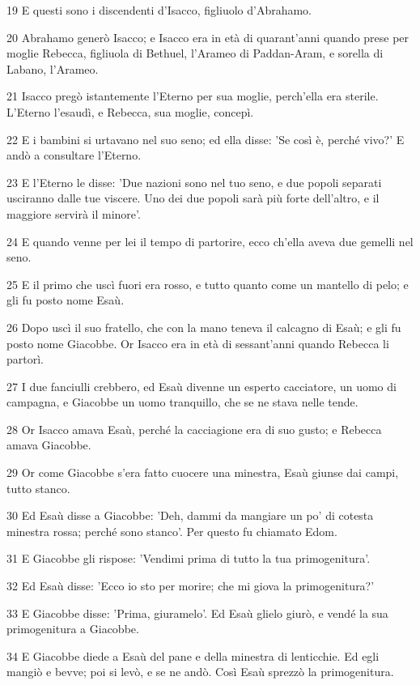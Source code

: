 \par 19 E questi sono i discendenti d'Isacco, figliuolo d'Abrahamo.
\par 20 Abrahamo generò Isacco; e Isacco era in età di quarant'anni quando prese per moglie Rebecca, figliuola di Bethuel, l'Arameo di Paddan-Aram, e sorella di Labano, l'Arameo.
\par 21 Isacco pregò istantemente l'Eterno per sua moglie, perch'ella era sterile. L'Eterno l'esaudì, e Rebecca, sua moglie, concepì.
\par 22 E i bambini si urtavano nel suo seno; ed ella disse: 'Se così è, perché vivo?' E andò a consultare l'Eterno.
\par 23 E l'Eterno le disse: 'Due nazioni sono nel tuo seno, e due popoli separati usciranno dalle tue viscere. Uno dei due popoli sarà più forte dell'altro, e il maggiore servirà il minore'.
\par 24 E quando venne per lei il tempo di partorire, ecco ch'ella aveva due gemelli nel seno.
\par 25 E il primo che uscì fuori era rosso, e tutto quanto come un mantello di pelo; e gli fu posto nome Esaù.
\par 26 Dopo uscì il suo fratello, che con la mano teneva il calcagno di Esaù; e gli fu posto nome Giacobbe. Or Isacco era in età di sessant'anni quando Rebecca li partorì.
\par 27 I due fanciulli crebbero, ed Esaù divenne un esperto cacciatore, un uomo di campagna, e Giacobbe un uomo tranquillo, che se ne stava nelle tende.
\par 28 Or Isacco amava Esaù, perché la cacciagione era di suo gusto; e Rebecca amava Giacobbe.
\par 29 Or come Giacobbe s'era fatto cuocere una minestra, Esaù giunse dai campi, tutto stanco.
\par 30 Ed Esaù disse a Giacobbe: 'Deh, dammi da mangiare un po' di cotesta minestra rossa; perché sono stanco'. Per questo fu chiamato Edom.
\par 31 E Giacobbe gli rispose: 'Vendimi prima di tutto la tua primogenitura'.
\par 32 Ed Esaù disse: 'Ecco io sto per morire; che mi giova la primogenitura?'
\par 33 E Giacobbe disse: 'Prima, giuramelo'. Ed Esaù glielo giurò, e vendé la sua primogenitura a Giacobbe.
\par 34 E Giacobbe diede a Esaù del pane e della minestra di lenticchie. Ed egli mangiò e bevve; poi si levò, e se ne andò. Così Esaù sprezzò la primogenitura.

